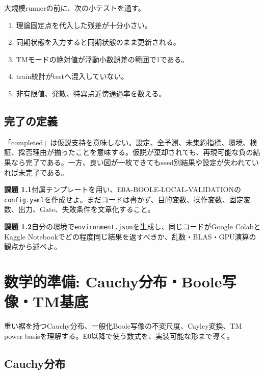 \documentclass[a4paper,11pt,oneside,openany]{ltjsbook}
\newcommand{\code}[1]{\texttt{#1}}
\newcommand{\EID}[1]{\textsf{#1}}
\newcommand{\Gate}{\textsf{Gate}}
\begin{document}
\begin{codebox}
大規模runnerの前に、次の小テストを通す。
\begin{enumerate}
  \item 理論固定点を代入した残差が十分小さい。
  \item 同期状態を入力すると同期状態のまま更新される。
  \item TMモードの絶対値が浮動小数誤差の範囲で1である。
  \item train統計がtestへ混入していない。
  \item 非有限値、発散、特異点近傍通過率を数える。
\end{enumerate}
\end{codebox}

\section{完了の定義}

「completed」は仮説支持を意味しない。設定、全予測、未集約指標、環境、検証、採否理由が揃ったことを意味する。仮説が棄却されても、再現可能な負の結果なら完了である。一方、良い図が一枚できてもseed別結果や設定が失われていれば未完了である。

\begin{taskbox}
\textbf{課題 1.1}\quad 付属テンプレートを用い、\EID{E0A-BOOLE-LOCAL-VALIDATION}の\code{config.yaml}を作成せよ。まだコードは書かず、目的変数、操作変数、固定変数、出力、\Gate、失敗条件を文章化すること。

\medskip
\textbf{課題 1.2}\quad 自分の環境で\code{environment.json}を生成し、同じコードがGoogle ColabとKaggle Notebookでどの程度同じ結果を返すべきか、乱数・BLAS・GPU演算の観点から述べよ。
\end{taskbox}

\chapter{数学的準備: Cauchy分布・Boole写像・TM基底}
\label{chap:foundation}

\begin{purposebox}
重い裾を持つCauchy分布、一般化Boole写像の不変尺度、Cayley変換、TM power basisを理解する。E0以降で使う数式を、実装可能な形まで導く。
\end{purposebox}

\section{Cauchy分布}
\end{document}
